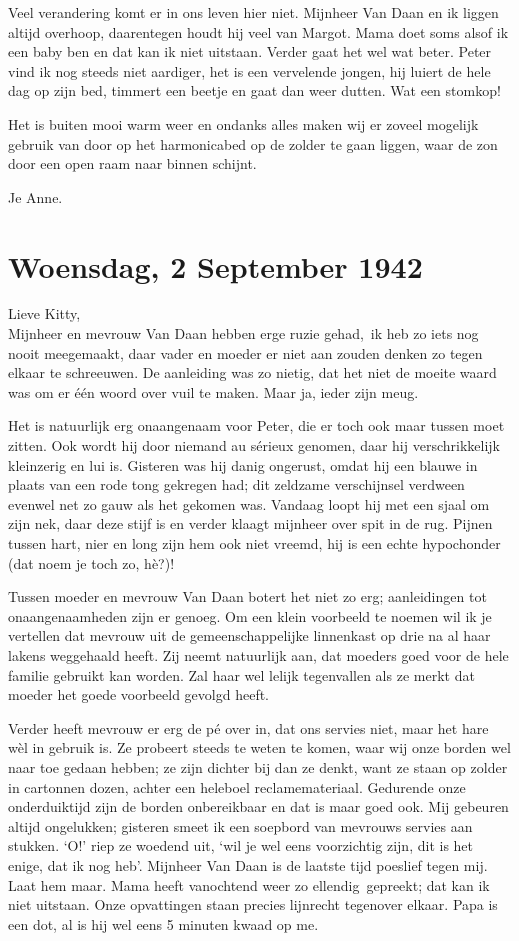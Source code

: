 \documentclass{book}
\begin{document}
Veel verandering komt er in ons leven hier niet. Mijnheer Van Daan en ik liggen
altijd overhoop, daarentegen houdt hij veel van Margot. Mama doet soms alsof ik
een baby ben en dat kan ik niet uitstaan. Verder gaat het wel wat beter. Peter
vind ik nog steeds niet aardiger, het is een vervelende jongen, hij luiert de
hele dag op zijn bed, timmert een beetje en gaat dan weer dutten. Wat een
stomkop!

Het is buiten mooi warm weer en ondanks alles maken wij er zoveel mogelijk
gebruik van door op het harmonicabed op de zolder te gaan liggen, waar de zon
door een open raam naar binnen schijnt.

Je Anne.

\section*{Woensdag, 2 September 1942}

Lieve Kitty,\\
Mijnheer en mevrouw Van Daan hebben erge ruzie gehad,~ik heb zo
iets nog nooit meegemaakt, daar vader en moeder er niet aan zouden denken zo
tegen elkaar te schreeuwen. De aanleiding was zo nietig, dat het niet de moeite
waard was om er één woord over vuil te maken. Maar ja, ieder zijn meug.

Het is natuurlijk erg onaangenaam voor Peter, die er toch ook maar tussen moet
zitten. Ook wordt hij door niemand au sérieux genomen, daar hij verschrikkelijk
kleinzerig en lui is. Gisteren was hij danig ongerust, omdat hij een blauwe in
plaats van een rode tong gekregen had; dit zeldzame verschijnsel verdween
evenwel net zo gauw als het gekomen was. Vandaag loopt hij met een sjaal om zijn
nek, daar deze stijf is en verder klaagt mijnheer over spit in de rug. Pijnen
tussen hart, nier en long zijn hem ook niet vreemd, hij is een echte hypochonder
(dat noem je toch zo, hè?)!

Tussen moeder en mevrouw Van Daan botert het niet zo erg; aanleidingen tot
onaangenaamheden zijn er genoeg. Om een klein voorbeeld te noemen wil ik je
vertellen dat mevrouw uit de gemeenschappelijke linnenkast op drie na al haar
lakens weggehaald heeft. Zij neemt natuurlijk aan, dat moeders goed voor de hele
familie gebruikt kan worden. Zal haar wel lelijk tegenvallen als ze merkt dat
moeder het goede voorbeeld gevolgd heeft.

Verder heeft mevrouw er erg de pé over in, dat ons servies niet, maar het hare
wèl in gebruik is. Ze probeert steeds te weten te komen, waar wij onze borden
wel naar toe gedaan hebben; ze zijn dichter bij dan ze denkt, want ze staan op
zolder in cartonnen dozen, achter een heleboel reclamemateriaal. Gedurende onze
onderduiktijd zijn de borden onbereikbaar en dat is maar goed ook. Mij gebeuren
altijd ongelukken; gisteren smeet ik een soepbord van mevrouws servies aan
stukken. `O!' riep ze woedend uit, `wil je wel eens voorzichtig zijn, dit is het
enige, dat ik nog heb'. Mijnheer Van Daan is de laatste tijd poeslief tegen mij.
Laat hem maar. Mama heeft vanochtend weer zo ellendig~gepreekt; dat kan ik niet
uitstaan. Onze opvattingen staan precies lijnrecht tegenover elkaar. Papa is een
dot, al is hij wel eens 5 minuten kwaad op me.
\end{document}
